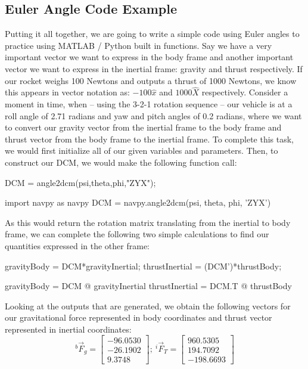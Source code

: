 \documentclass[10pt, openany, titlepage]{book}
\theoremstyle{definition}
\begin{document}
\subsection{Euler Angle Code Example}\label{sec:EulerDynamicsMATLABExample}

Putting it all together, we are going to write a simple code using \gls{Euler angles} to practice using MATLAB / Python built in functions. Say we have a very important vector we want to express in the \gls{body frame} and another important vector we want to express in the \gls{inertial frame}: gravity and thrust respectively. If our rocket weighs 100 Newtons and outputs a thrust of 1000 Newtons, we know this appears in vector notation as: $-100\hat{x}$ and $1000\hat{X}$ respectively. Consider a moment in time, when -- using the 3-2-1 rotation sequence -- our vehicle is at a roll angle of 2.71 radians and yaw and pitch angles of 0.2 radians, where we want to convert our gravity vector from the \gls{inertial frame} to the \gls{body frame} and thrust vector from the body frame to the inertial frame. To complete this task, we would first initialize all of our given variables and parameters. Then, to construct our DCM, we would make the following function call:

\begin{matlabscript}{}
DCM = angle2dcm(psi,theta,phi,"ZYX");
\end{matlabscript}
\begin{pythonscript}{}
import navpy as navpy
DCM = navpy.angle2dcm(psi, theta, phi, 'ZYX')
\end{pythonscript}

As this would return the rotation matrix translating from the inertial to body frame, we can complete the following two simple calculations to find our quantities expressed in the other frame:

\begin{matlabscript}{}
gravityBody = DCM*gravityInertial;
thrustInertial = (DCM')*thrustBody;
\end{matlabscript}
\begin{pythonscript}{}
gravityBody = DCM @ gravityInertial
thrustInertial = DCM.T @ thrustBody
\end{pythonscript}

Looking at the outputs that are generated, we obtain the following vectors for our gravitational force represented in body coordinates and thrust vector represented in inertial coordinates:
\begin{equation}
    ^b\vec{F}_{g}=\begin{bmatrix}
        -96.0530\\-26.1902\\9.3748
    \end{bmatrix};\ ^i\vec{F}_{T}=\begin{bmatrix}
        960.5305\\194.7092\\-198.6693
    \end{bmatrix}
\end{equation}
\end{document}
